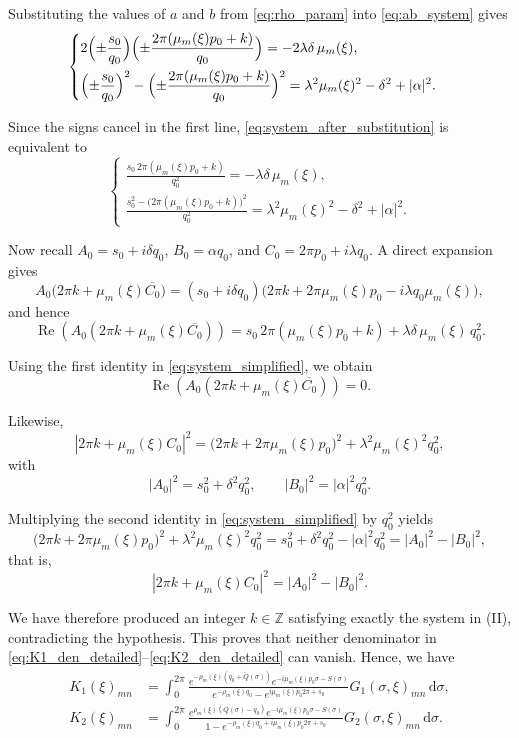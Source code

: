 \documentclass[11pt,reqno]{amsart}
\numberwithin{equation}{section}
\begin{document}
Substituting the values of $a$ and $b$ from \eqref{eq:rho_param} into
\eqref{eq:ab_system} gives
\begin{equation}\label{eq:system_after_substitution}
	\begin{cases}
		\displaystyle
		2\Bigl(\pm\frac{s_0}{q_0}\Bigr)\Bigl(\pm\frac{2\pi(\mu_m(\xi)p_0+k)}{q_0}\Bigr)
		=-2\lambda\delta\,\mu_m(\xi),\\[3mm]
		\displaystyle
		\Bigl(\pm\frac{s_0}{q_0}\Bigr)^2-\Bigl(\pm\frac{2\pi(\mu_m(\xi)p_0+k)}{q_0}\Bigr)^2
		=\lambda^2\mu_m(\xi)^2-\delta^2+|\alpha|^2.
	\end{cases}
\end{equation}

Since the signs cancel in the first line, \eqref{eq:system_after_substitution} is
equivalent to
\begin{equation}\label{eq:system_simplified}
	\begin{cases}
		\displaystyle
		\frac{s_0\,2\pi(\mu_m(\xi)p_0+k)}{q_0^2}=-\lambda\delta\,\mu_m(\xi),\\[3mm]
		\displaystyle
		\frac{s_0^2-\bigl(2\pi(\mu_m(\xi)p_0+k)\bigr)^2}{q_0^2}
		=\lambda^2\mu_m(\xi)^2-\delta^2+|\alpha|^2.
	\end{cases}
\end{equation}

Now recall $A_0=s_0+i\delta q_0$, $B_0=\alpha q_0$, and $C_0=2\pi p_0+i\lambda q_0$.
A direct expansion gives
\[
A_0\bigl(2\pi k+\mu_m(\xi)\overline{C_0}\bigr)
=(s_0+i\delta q_0)\bigl(2\pi k+2\pi\mu_m(\xi)p_0-i\lambda q_0\mu_m(\xi)\bigr),
\]
and hence
\[
\operatorname{Re}\!\left(A_0(2\pi k+\mu_m(\xi)\overline{C_0})\right)
=s_0\,2\pi(\mu_m(\xi)p_0+k)+\lambda\delta\,\mu_m(\xi)\,q_0^2.
\]

Using the first identity in \eqref{eq:system_simplified}, we obtain
\[
\operatorname{Re}\!\left(A_0(2\pi k+\mu_m(\xi)\overline{C_0})\right)=0.
\]

Likewise,
\[
|2\pi k+\mu_m(\xi)C_0|^2
=\bigl(2\pi k+2\pi\mu_m(\xi)p_0\bigr)^2+\lambda^2\mu_m(\xi)^2q_0^2,
\]
with
\[
|A_0|^2=s_0^2+\delta^2q_0^2, \qquad |B_0|^2=|\alpha|^2q_0^2.
\]

Multiplying the second identity in \eqref{eq:system_simplified} by $q_0^2$ yields
\[
\bigl(2\pi k+2\pi\mu_m(\xi)p_0\bigr)^2+\lambda^2\mu_m(\xi)^2q_0^2
=s_0^2+\delta^2q_0^2-|\alpha|^2q_0^2
=|A_0|^2-|B_0|^2,
\]
that is,
\[
|2\pi k+\mu_m(\xi)C_0|^2=|A_0|^2-|B_0|^2.
\]

We have therefore produced an integer $k\in\mathbb{Z}$ satisfying exactly the system
in (II), contradicting the hypothesis. This proves that neither denominator in
\eqref{eq:K1_den_detailed}--\eqref{eq:K2_den_detailed} can vanish.
Hence, we have
\begin{align*}
K_1(\xi)_{mn} & = \int_0^{2\pi} \frac{e^{-\rho_m(\xi)(q_0 + \widetilde Q(\sigma))} e^{-i\mu_m(\xi) p_0 \sigma - S(\sigma)}}{e^{-\rho_m(\xi) q_0} - e^{i\mu_m(\xi) p_0 2\pi + s_0}} G_1(\sigma,\xi)_{mn} \, \mathrm{d}\sigma,\\[3mm]
K_2(\xi)_{mn} & = \int_0^{2\pi} \frac{e^{\rho_m(\xi)(Q(\sigma) - q_0)} e^{-i\mu_m(\xi) p_0 \sigma - S(\sigma)}}{1 - e^{-\rho_m(\xi) q_0 + i\mu_m(\xi) p_0 2\pi + s_0}} G_2(\sigma,\xi)_{mn} \, \mathrm{d}\sigma.
\end{align*}
\end{document}
